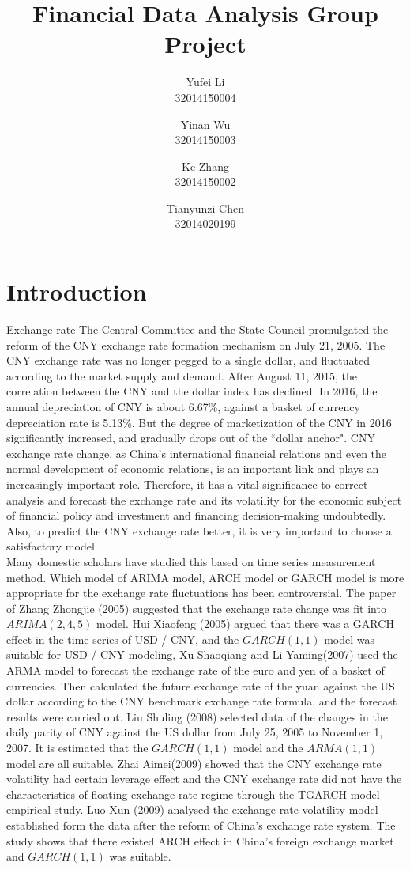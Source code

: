 \documentclass[12pt, a4paper, titlepage]{article}
\title{Financial Data Analysis Group Project\\
}
\author{Yufei Li  \\
	32014150004  \\
	\and 
	Yinan Wu \\
	32014150003 \\
	\and
	Ke Zhang\\
	32014150002\\
	\and
	Tianyunzi Chen\\
	32014020199
	}
\date{}
\begin{document}
\maketitle

\begin{abstract}

\end{abstract}

\tableofcontents 
\newpage

\section{Introduction}
Exchange rate 
The Central Committee and the State Council promulgated the reform of the CNY exchange rate formation mechanism on July 21, 2005. The CNY exchange rate was no longer pegged to a single dollar, and fluctuated according to the market supply and demand. After August 11, 2015, the correlation between the CNY and the dollar index has declined. In 2016, the annual depreciation of CNY is about 6.67\%, against a basket of currency depreciation rate is 5.13\%. But the degree of marketization of the CNY in 2016 significantly increased, and gradually drops out of the ``dollar anchor". CNY exchange rate change, as China's international financial relations and even the normal development of economic relations, is an important link and plays an increasingly important role. Therefore, it has a vital significance to correct analysis and forecast the exchange rate and its volatility for the economic subject of financial policy and investment and financing decision-making undoubtedly. Also, to predict the CNY exchange rate better, it is very important to choose a satisfactory model.\\

Many domestic scholars have studied this based on time series measurement method. Which model of ARIMA model, ARCH model or GARCH model is more appropriate for the exchange rate fluctuations has been controversial. The paper of Zhang Zhongjie (2005) suggested that the exchange rate change was fit into $ARIMA(2,4,5)$ model. Hui Xiaofeng (2005) argued that there was a GARCH effect in the time series of USD / CNY, and the $GARCH(1,1)$ model was suitable for USD / CNY modeling, Xu Shaoqiang and Li Yaming(2007) used the ARMA model to forecast the exchange rate of the euro and yen of a basket of currencies. Then calculated the future exchange rate of the yuan against the US dollar according to the CNY benchmark exchange rate formula, and the forecast results were carried out. Liu Shuling (2008) selected data of the changes in the daily parity of CNY against the US dollar from July 25, 2005 to November 1, 2007. It is estimated that the $GARCH(1,1)$ model and the $ARMA(1,1)$ model are all suitable. Zhai Aimei(2009) showed that the CNY exchange rate volatility had certain leverage effect and the CNY exchange rate did not have the characteristics of floating exchange rate regime through the TGARCH model empirical study. Luo Xun (2009) analysed the exchange rate volatility model established form the data after the reform of China's exchange rate system. The study shows that there existed ARCH effect in China's foreign exchange market and $GARCH(1,1)$ was suitable.\\
\end{document}
